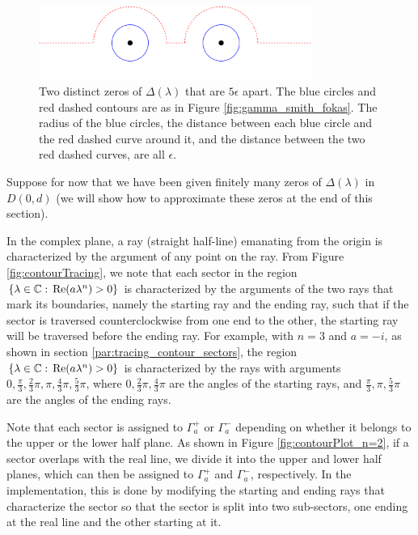 \documentclass[12pt, oneside, a4paper]{article}
\begin{document}
\begin{figure}[htpb!]
    \centering
    \includegraphics[width=0.8\textwidth]{epsilon_ps.png}
    \caption{Two distinct zeros of $\Delta(\lambda)$ that are $5\epsilon$ apart. The blue circles and red dashed contours are as in Figure \ref{fig:gamma_smith_fokas}. The radius of the blue circles, the distance between each blue circle and the red dashed curve around it, and the distance between the two red dashed curves, are all $\epsilon$.}
    \label{fig:epsilon}
\end{figure}

Suppose for now that we have been given finitely many zeros of $\Delta(\lambda)$ in $D(0, d)$ (we will show how to approximate these zeros at the end of this section).

In the complex plane, a ray (straight half-line) emanating from the origin is characterized by the argument of any point on the ray. From Figure \ref{fig:contourTracing}, we note that each sector in the region $\{\lambda\in\mathbb C:\, \mathrm{Re}(a\lambda^n)>0\}$ is characterized by the arguments of the two rays that mark its boundaries, namely the starting ray and the ending ray, such that if the sector is traversed counterclockwise from one end to the other, the starting ray will be traversed before the ending ray. For example, with $n=3$ and $a=-i$, as shown in section \ref{par:tracing_contour_sectors}, the region $\{\lambda\in\mathbb C:\, \mathrm{Re}(a\lambda^n)>0\}$ is characterized by the rays with arguments $0, \frac{\pi}{3}, \frac{2}{3}\pi, \pi, \frac{4}{3}\pi, \frac{5}{3}\pi$, where $0, \frac{2}{3}\pi, \frac{4}{3}\pi$ are the angles of the starting rays, and $\frac{\pi}{3}, \pi, \frac{5}{3}\pi$ are the angles of the ending rays. 

Note that each sector is assigned to $\Gamma_a^+$ or $\Gamma_a^-$ depending on whether it belongs to the upper or the lower half plane. As shown in Figure \ref{fig:contourPlot_n=2}, if a sector overlaps with the real line, we divide it into the upper and lower half planes, which can then be assigned to $\Gamma_a^+$ and $\Gamma_a^-$, respectively. In the implementation, this is done by modifying the starting and ending rays that characterize the sector so that the sector is split into two sub-sectors, one ending at the real line and the other starting at it.
\end{document}
